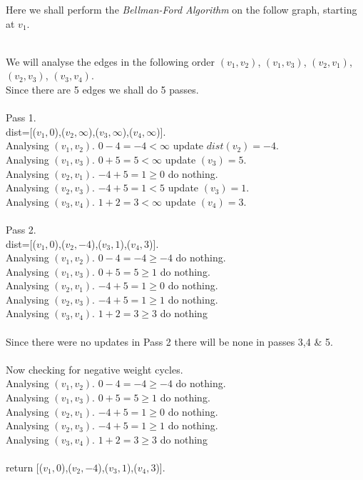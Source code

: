 \documentclass[11pt,a4paper]{article}
\begin{document}
\newpage
{}
Here we shall perform the \textit{Bellman-Ford Algorithm} on the follow graph, starting at $v_1$.\\
\\
We will analyse the edges in the following order $(v_1,v_2)$, $(v_1,v_3)$, $(v_2,v_1)$, $(v_2,v_3)$, $(v_3,v_4)$.\\
Since there are 5 edges we shall do 5 passes.\\
\\
Pass 1.\\
dist=[($v_1,0$),($v_2,\infty$),($v_3,\infty$),($v_4,\infty$)].\\
Analysing $(v_1,v_2)$. $0-4=-4<\infty$ update $dist(v_2)=-4$.\\
Analysing $(v_1,v_3)$. $0+5=5<\infty$ update $(v_3)=5$.\\
Analysing $(v_2,v_1)$. $-4+5=1\geq0$ do nothing.\\
Analysing $(v_2,v_3)$. $-4+5=1<5$ update $(v_3)=1$.\\
Analysing $(v_3,v_4)$. $1+2=3<\infty$ update $(v_4)=3$.\\
\\
Pass 2.\\
dist=[($v_1,0$),($v_2,-4$),($v_3,1$),($v_4,3$)].\\
Analysing $(v_1,v_2)$. $0-4=-4\geq-4$ do nothing.\\
Analysing $(v_1,v_3)$. $0+5=5\geq1$ do nothing.\\
Analysing $(v_2,v_1)$. $-4+5=1\geq0$ do nothing.\\
Analysing $(v_2,v_3)$. $-4+5=1\geq1$ do nothing.\\
Analysing $(v_3,v_4)$. $1+2=3\geq3$ do nothing\\
\\
Since there were no updates in Pass 2 there will be none in passes 3,4 \& 5.\\
\\
Now checking for negative weight cycles.\\
Analysing $(v_1,v_2)$. $0-4=-4\geq-4$ do nothing.\\
Analysing $(v_1,v_3)$. $0+5=5\geq1$ do nothing.\\
Analysing $(v_2,v_1)$. $-4+5=1\geq0$ do nothing.\\
Analysing $(v_2,v_3)$. $-4+5=1\geq1$ do nothing.\\
Analysing $(v_3,v_4)$. $1+2=3\geq3$ do nothing\\
\\
return [($v_1,0$),($v_2,-4$),($v_3,1$),($v_4,3$)].\\
\end{document}
